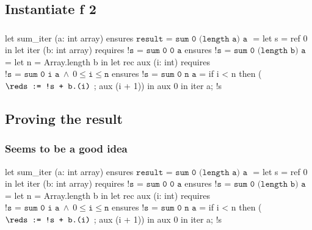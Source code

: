 \documentclass[xcolor=dvipsnames]{beamer}
\newcommand{\bwedge}{\boldsymbol{~\wedge~}}
\begin{document}
\subsection*{Instantiate f 2}
\begin{frame}[fragile]
\frametitle{}
\vspace*{0em}
\begin{footnotesize}
\begin{whycode}
let sum_iter (a: int array) 
ensures { $\texttt{result = sum 0 (length a) a }$}
= let s = ref 0 in 
  let iter (b: int array)
  requires { ${ \texttt{!s = sum 0 0 a}}$ } 
  ensures  { ${ \texttt{!s = sum 0 (length b) a}}$ } 
  = let n = Array.length b in
    let rec aux (i: int)
    requires { ${\texttt{!s = sum 0 i a}\bwedge 0 \leq \texttt{i} \leq \texttt{n}}$ }
    ensures  { ${\texttt{!s = sum 0 n a}}$ }
    = if i < n
      then (${\red\texttt{s := !s + b.(i)}}$ ; aux (i + 1)) 
    in aux 0
  in iter a; 
  !s
\end{whycode}
\end{footnotesize}
\end{frame}

\subsection*{Proving the result}
\begin{frame}[fragile]
\frametitle<1-4>{}
\frametitle<5>{\normalsize \red Seems to be a good idea}
\vspace*{-2em}
\begin{footnotesize}
\begin{whycode}
let sum_iter (a: int array) 
ensures { $\texttt{result = sum 0 (length a) a }$}
= let s = ref 0 in 
  let iter (b: int array)
  requires { ${ \texttt{!s = sum 0 0 a}}$ } 
  ensures  { ${ \texttt{!s = sum 0 (length b) a}}$ } 
  = let n = Array.length b in
    let rec aux (i: int)
    requires { ${\texttt{!s = sum 0 i a}\bwedge 0 \leq \texttt{i} \leq \texttt{n}}$ }
    ensures  { ${\texttt{!s = sum 0 n a}}$ }
    = if i < n
      then (${\red\texttt{s := !s + b.(i)}}$ ; aux (i + 1)) 
    in aux 0
  in iter a; 
  !s
\end{whycode}
\vspace*{-4em}
\begin{center} 
\end{center}
\end{footnotesize}
\end{frame}
\end{document}
